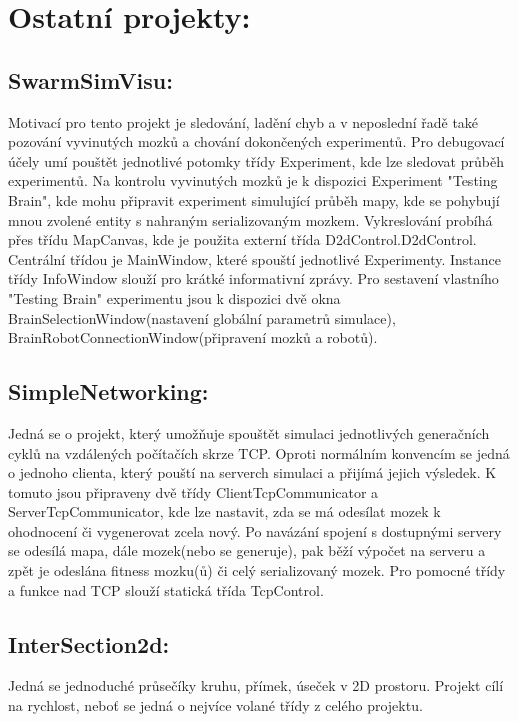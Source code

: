 \documentclass[12pt, oneside]{article}
\begin{document}
\newpage
\section{Ostatní projekty:}
\subsection{SwarmSimVisu:}
Motivací pro tento projekt je sledování, ladění chyb a v neposlední řadě také pozování vyvinutých mozků a chování dokončených experimentů. Pro debugovací účely umí pouštět jednotlivé potomky třídy Experiment, kde lze sledovat průběh experimentů. Na kontrolu vyvinutých mozků je k dispozici Experiment "Testing Brain", kde mohu připravit experiment simulující průběh mapy, kde se pohybují mnou zvolené entity s nahraným serializovaným mozkem. Vykreslování probíhá přes třídu MapCanvas, kde je použita externí třída D2dControl.D2dControl. Centrální třídou je MainWindow, které spouští jednotlivé Experimenty. Instance třídy InfoWindow slouží pro krátké informativní zprávy. Pro sestavení vlastního "Testing Brain" experimentu jsou k dispozici dvě okna BrainSelectionWindow(nastavení globální parametrů simulace), BrainRobotConnectionWindow(připravení mozků a robotů). 
\subsection{SimpleNetworking:} 
Jedná se o projekt, který umožňuje spouštět simulaci jednotlivých generačních cyklů na vzdálených počítačích skrze TCP. Oproti normálním konvencím se jedná o jednoho clienta, který pouští na serverch simulaci a přijímá jejich výsledek. K tomuto jsou připraveny dvě třídy ClientTcpCommunicator a ServerTcpCommunicator, kde lze nastavit, zda se má odesílat mozek k ohodnocení či vygenerovat zcela nový. Po navázání spojení s dostupnými servery se odesílá mapa, dále mozek(nebo se generuje), pak běží výpočet na serveru a zpět je odeslána fitness mozku(ů) či celý serializovaný mozek. Pro pomocné třídy a funkce nad TCP slouží statická třída TcpControl.
\subsection{InterSection2d:}
Jedná se  jednoduché průsečíky kruhu, přímek, úseček v 2D prostoru. Projekt cílí na rychlost, neboť se jedná o nejvíce volané třídy z celého projektu.
  
\end{document}
